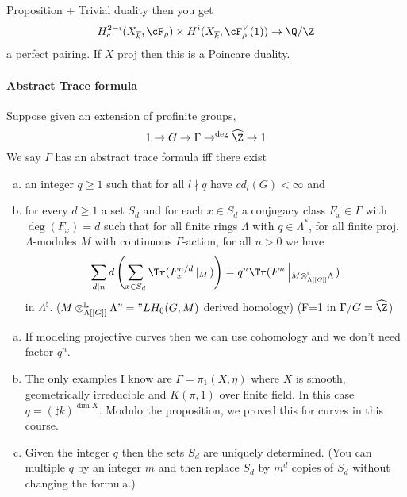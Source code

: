 \begin{remark} Proposition $+$ Trivial duality then you get
	$$H^{2-i}_c(X_{\overline k}, \cF_\rho)\times H^i(X_{\overline k}, \cF_\rho^V(1))\to \Q/\Z$$
	a perfect pairing. If $X$ proj then this is a Poincare duality. 
\end{remark}

\paragraph{Abstract Trace formula} Suppose given an extension of profinite groups, 
	$$1\to G\to \Gamma\to^{\deg} \widehat\Z\to 1$$
We say $\Gamma$ has an abstract trace formula iff there exist
	\begin{enumerate}[(a)]
	\item an integer $q\geq 1$ such that for all $l\nmid q$ have $cd_l(G)<\infty$ and
	\item for every $d\geq 1$ a set $S_d$ and for each $x\in S_d$ a conjugacy class $F_x \in \Gamma$ with $\deg(F_x)=d$ such that for all finite rings $\Lambda$ with $q\in \Lambda^*$, for all finite proj. $\Lambda$-modules $M$ with continuous $\Gamma$-action, for all $n>0$ we have
		$$\sum_{d|n}d\left(\sum_{x\in S_d}\Tr(F_x^{n/d}\left|_M\right.)\right) = q^n\Tr(F^n\left|_{M\otimes_{\Lambda[[G]]}^{\mathbb L}\Lambda}\right.)$$
		in $\Lambda^\natural$.  ($M\otimes_{\Lambda[[G]]}^{\mathbb L}\Lambda"=" LH_0(G, M)$ derived homology)
	(F=1 in $\Gamma/G=\widehat \Z$)
	\end{enumerate}	
	
\begin{remark}
	\begin{enumerate}[(a)]
	\item If modeling projective curves then we can use cohomology and we don't need factor $q^n$. 
	\item The only examples I know are $\Gamma=\pi_1(X, \overline \eta)$ where $X$ is smooth, geometrically irreducible and $K(\pi, 1)$ over finite field. In this case $q=(\sharp k)^{\dim X}$. Modulo the proposition, we proved this for curves in this course.
	\item Given the integer $q$ then the sets $S_d$ are uniquely determined. (You can multiple $q$ by an integer $m$ and then replace $S_d$ by $m^d$ copies of $S_d$ without changing the formula.) 
	\end{enumerate}
\end{remark}
	
